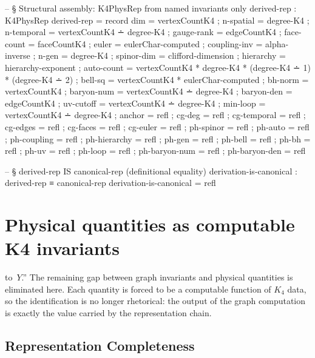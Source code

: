 \documentclass[11pt,a4paper]{book}
\def\texorpdfstring#1#2{#2}%
\begin{document}
\begin{code}
  -- § Structural assembly: K4PhysRep from named invariants only
  derived-rep : K4PhysRep
  derived-rep = record
    { dim          = vertexCountK4
    ; n-spatial    = degree-K4
    ; n-temporal   = vertexCountK4 ∸ degree-K4
    ; gauge-rank   = edgeCountK4
    ; face-count   = faceCountK4
    ; euler        = eulerChar-computed
    ; coupling-inv = alpha-inverse
    ; n-gen        = degree-K4
    ; spinor-dim   = clifford-dimension
    ; hierarchy    = hierarchy-exponent
    ; auto-count   = vertexCountK4 * degree-K4
                   * (degree-K4 ∸ 1) * (degree-K4 ∸ 2)
    ; bell-sq      = vertexCountK4 * eulerChar-computed
    ; bh-norm      = vertexCountK4
    ; baryon-num   = vertexCountK4 ∸ degree-K4
    ; baryon-den   = edgeCountK4
    ; uv-cutoff    = vertexCountK4 ∸ degree-K4
    ; min-loop     = vertexCountK4 ∸ degree-K4
    ; anchor       = refl
    ; cg-deg       = refl
    ; cg-temporal  = refl
    ; cg-edges     = refl
    ; cg-faces     = refl
    ; cg-euler     = refl
    ; ph-spinor    = refl
    ; ph-auto      = refl
    ; ph-coupling  = refl
    ; ph-hierarchy = refl
    ; ph-gen       = refl
    ; ph-bell      = refl
    ; ph-bh        = refl
    ; ph-uv        = refl
    ; ph-loop      = refl
    ; ph-baryon-num = refl
    ; ph-baryon-den = refl
    }

  -- § derived-rep IS canonical-rep (definitional equality)
  derivation-is-canonical : derived-rep ≡ canonical-rep
  derivation-is-canonical = refl
\end{code}


\section{Physical quantities as computable \texorpdfstring{$K_4$}{K4} invariants}

to~$Y$.''
The remaining gap between graph invariants and physical quantities is eliminated here. Each quantity is forced to be a computable function of $K_4$ data, so the identification is no longer rhetorical: the output of the graph computation is exactly the value carried by the representation chain.

\subsection{Representation Completeness}
\end{document}
